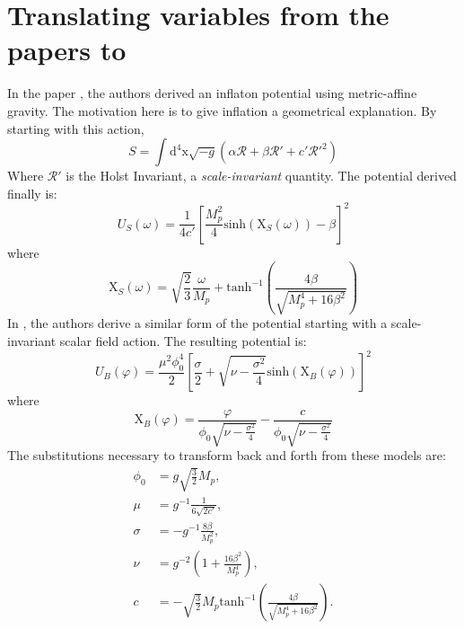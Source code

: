 \documentclass[aps,prd,reprint,preprintnumbers,showpacs,floatfix,nofootinbib,superscript address]{revtex4-2}
\begin{document}
\section{Translating variables from the papers \cite{Salvio_2022} to \cite{barker2024poincaregaugetheoryconformal}} \label{Appendix A}
In the paper \cite{Salvio_2022}, the authors derived an inflaton potential using metric-affine gravity. The motivation here is to give inflation a geometrical explanation. 
By starting with this action, 
\begin{equation}
    S = \int \text{d}^4\text{x} \sqrt{-g} (\alpha \mathcal{R} + \beta \mathcal{R}' + c' \mathcal{R}'^{2})
\end{equation}
Where $\mathcal{R}'$ is the Holst Invariant, a \textit{scale-invariant} quantity. The potential derived finally is: 
\begin{equation}
    U_S(\omega) = \frac{1}{4 c'} \left[ \frac{M_{p}^{2}}{4} \text{sinh}(\text{X}_S(\omega)) - \beta  \right]^2
\end{equation}
where
\begin{equation}
    \text{X}_S(\omega) = \sqrt{\frac{2}{3}} \frac{\omega}{M_{p}} + \text{tanh}^{-1} \left(\frac{4 \beta}{\sqrt{M_{p}^{4}+16 \beta^2}} \right)
\end{equation}
In \cite{barker2024poincaregaugetheoryconformal}, the authors derive a similar form of the potential starting with a scale-invariant scalar field action. The resulting potential is:
\begin{equation}
    U_B(\varphi) = \frac{\mu^2 \phi_{0}^{4}}{2} \left[ \frac{\sigma}{2} + \sqrt{\nu - \frac{\sigma^2}{4}} \text{sinh}\left( \text{X}_B(\varphi) \right)  \right]^2
\end{equation}
where
\begin{equation}
    \text{X}_B(\varphi) =  \frac{\varphi}{\phi_0 \sqrt{\nu - \frac{\sigma^2}{4}}} - \frac{c}{\phi_0 \sqrt{\nu - \frac{\sigma^2}{4}}}
\end{equation}
The substitutions necessary to transform back and forth from these models are: 
\begin{subequations}
    \begin{align}
    \phi_0 &= g \sqrt{\frac{3}{2}} M_p , \\
    \mu &= g^{-1} \frac{1}{6 \sqrt{2 c'}}, \\
    \sigma &= - g^{-1} \frac{8 \beta}{M_{p}^{2}} , \\
    \nu &= g^{-2} \left( 1 + \frac{16 \beta^2}{M_{p}^{4}} \right) , \\
    c  &= -\sqrt{\frac{3}{2}} M_{p} \text{tanh}^{-1} \left(\frac{4 \beta}{\sqrt{M_{p}^{4}+16 \beta^2}} \right).
\end{align}
\end{subequations}
\end{document}
